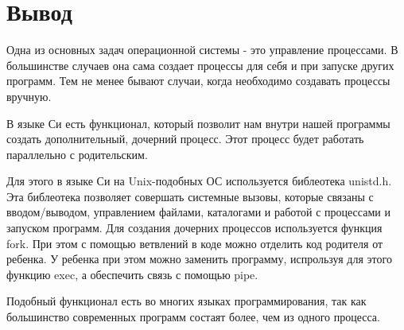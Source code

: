 \documentclass[pdf, unicode, 12pt, a4paper,oneside,fleqn]{article}
\begin{document}
\pagebreak

\section{Вывод}

Одна из основных задач операционной системы - это управление процессами.
В большинстве случаев она сама создает процессы для себя и при запуске других программ.
Тем не менее бывают случаи, когда необходимо создавать процессы вручную.

В языке Си есть функционал, который позволит нам внутри нашей программы создать
дополнительный, дочерний процесс. Этот процесс будет работать параллельно с родительским.

Для этого в языке Си на Unix-подобных ОС используется библеотека unistd.h.
Эта библеотека позволяет совершать системные вызовы, которые связаны с 
вводом/выводом, управлением файлами, каталогами и работой с процессами и запуском программ.
Для создания дочерних процессов используется функция fork. При этом с помощью ветвлений 
в коде можно отделить код родителя от ребенка. У ребенка при этом можно заменить программу,
испрользуя для этого функцию exec, а обеспечить связь с помощью pipe.

Подобный функционал есть во многих языках программирования, так как большинство современных программ состаят более, чем из одного процесса.
\end{document}
